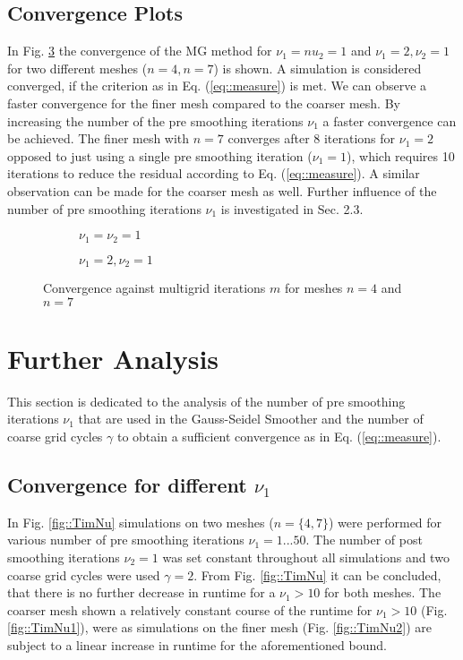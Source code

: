 \documentclass[11pt,a4paper]{article}
\newcommand{\refFig}[1]{Fig. \ref{#1}}
\newcommand{\refEq}[1]{Eq. (\ref{#1})}
\begin{document}
\subsection{Convergence Plots}
In \refFig{fig::Res} the convergence of the MG method for $\nu_1=nu_2=1$ and  $\nu_1 = 2, \nu_2=1$ for two different meshes ($n=4, n=7$) is shown. A simulation is considered converged, if the criterion as in \refEq{eq::measure} is met. We can observe a faster convergence for the finer mesh compared to the coarser mesh. By increasing the number of the pre smoothing iterations $\nu_1$ a faster convergence can be achieved. The finer mesh with $n=7$ converges after 8 iterations for $\nu_1=2$ opposed to just using a single pre smoothing iteration ($\nu_1 = 1$), which requires 10 iterations to reduce the residual according to \refEq{eq::measure}. A similar observation can be made for the coarser mesh as well. Further influence of the number of pre smoothing iterations $\nu_1$ is investigated in Sec. 2.3.
\begin{figure}[h!]
	\centering
	\begin{subfigure}[h!]{.49\textwidth}
		\begin{center}
			\resizebox{0.52\width}{!}{}
			\caption{$\nu_1 = \nu_2 = 1$}
			\label{fig::Res1}
		\end{center}	
	\end{subfigure}
	\hfill
	\begin{subfigure}[h!]{.49\textwidth}
		\centering
		\resizebox{0.52\width}{!}{}
		\caption{$\nu_1 = 2,  \nu_2 = 1$}
		\label{fig::Res2}
	\end{subfigure}
	\caption{Convergence against multigrid iterations $m$ for meshes $n=4$ and $n=7$ }
	\label{fig::Res}
\end{figure}

\newpage
\section{Further Analysis}
This section is dedicated to the analysis of the number of pre smoothing iterations $\nu_1$ that are used in the Gauss-Seidel Smoother and the number of coarse grid cycles $\gamma$ to obtain a sufficient convergence as in \refEq{eq::measure}. 
\subsection{Convergence for different $\nu_1$}
In \refFig{fig::TimNu} simulations on two meshes ($n=\{4, 7\}$) were performed for various number of pre smoothing iterations $\nu_1 = 1...50$. The number of post smoothing iterations $\nu_2 = 1$ was set constant throughout all simulations and two coarse grid cycles were used $\gamma = 2$.
From \refFig{fig::TimNu} it can be concluded, that there is no further decrease in runtime for a  $\nu_1 > 10$ for both meshes. The coarser mesh shown a relatively constant course of the runtime for $\nu_1 > 10$ (\refFig{fig::TimNu1}), were as simulations on the finer mesh (\refFig{fig::TimNu2}) are subject to a linear increase in runtime for the aforementioned bound.
\end{document}
